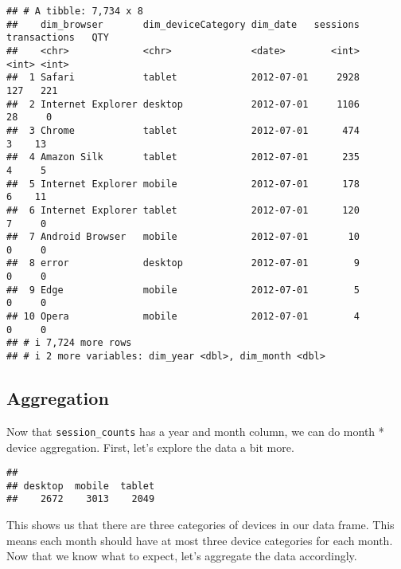 \documentclass[
]{article}
\newenvironment{Shaded}{\begin{snugshade}}{\end{snugshade}}
\newcommand{\FunctionTok}[1]{\textcolor[rgb]{0.13,0.29,0.53}{\textbf{#1}}}
\newcommand{\NormalTok}[1]{#1}
\newcommand{\SpecialCharTok}[1]{\textcolor[rgb]{0.81,0.36,0.00}{\textbf{#1}}}
\begin{document}
\begin{verbatim}
## # A tibble: 7,734 x 8
##    dim_browser       dim_deviceCategory dim_date   sessions transactions   QTY
##    <chr>             <chr>              <date>        <int>        <int> <int>
##  1 Safari            tablet             2012-07-01     2928          127   221
##  2 Internet Explorer desktop            2012-07-01     1106           28     0
##  3 Chrome            tablet             2012-07-01      474            3    13
##  4 Amazon Silk       tablet             2012-07-01      235            4     5
##  5 Internet Explorer mobile             2012-07-01      178            6    11
##  6 Internet Explorer tablet             2012-07-01      120            7     0
##  7 Android Browser   mobile             2012-07-01       10            0     0
##  8 error             desktop            2012-07-01        9            0     0
##  9 Edge              mobile             2012-07-01        5            0     0
## 10 Opera             mobile             2012-07-01        4            0     0
## # i 7,724 more rows
## # i 2 more variables: dim_year <dbl>, dim_month <dbl>
\end{verbatim}

\hypertarget{aggregation}{%
\subsection{Aggregation}\label{aggregation}}

Now that \texttt{session\_counts} has a year and month column, we can do
month * device aggregation. First, let's explore the data a bit more.

\begin{Shaded}
\end{Shaded}

\begin{verbatim}
## 
## desktop  mobile  tablet 
##    2672    3013    2049
\end{verbatim}

This shows us that there are three categories of devices in our data
frame. This means each month should have at most three device categories
for each month. Now that we know what to expect, let's aggregate the
data accordingly.
\end{document}

